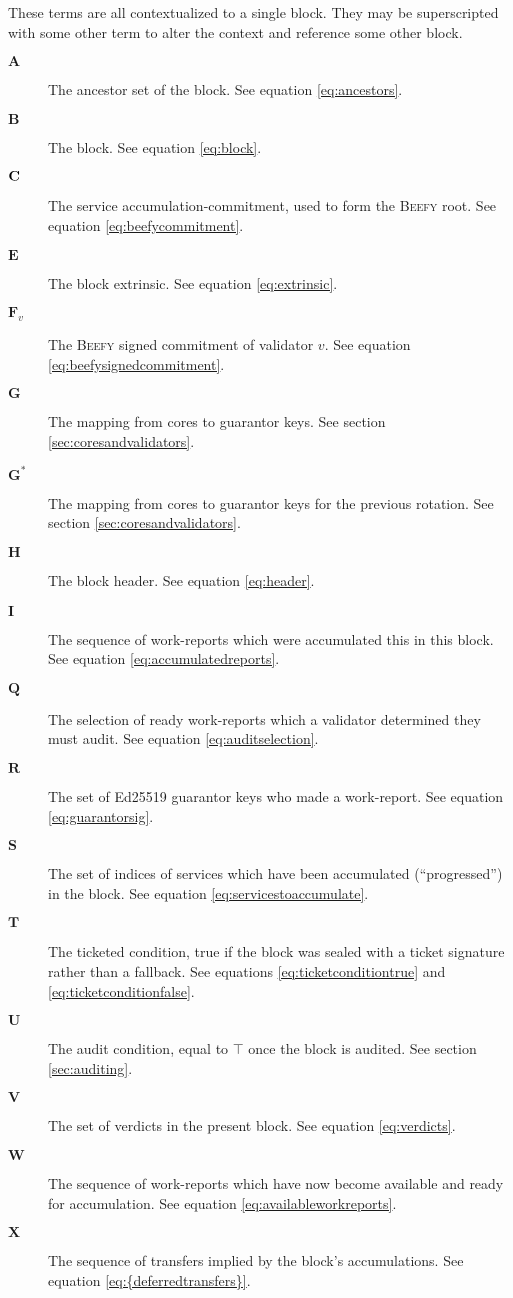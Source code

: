 These terms are all contextualized to a single block. They may be superscripted with some other term to alter the context and reference some other block.
\begin{description}
  \item[$\mathbf{A}$] The ancestor set of the block. See equation \ref{eq:ancestors}.
  \item[$\mathbf{B}$] The block. See equation \ref{eq:block}.
  \item[$\mathbf{C}$] The service accumulation-commitment, used to form the \textsc{Beefy} root. See equation \ref{eq:beefycommitment}.
  \item[$\mathbf{E}$] The block extrinsic. See equation \ref{eq:extrinsic}.
  \item[$\mathbf{F}_v$] The \textsc{Beefy} signed commitment of validator $v$. See equation \ref{eq:beefysignedcommitment}.
  \item[$\mathbf{G}$] The mapping from cores to guarantor keys. See section \ref{sec:coresandvalidators}.
  \item[$\mathbf{G^*}$] The mapping from cores to guarantor keys for the previous rotation. See section \ref{sec:coresandvalidators}.
  \item[$\mathbf{H}$] The block header. See equation \ref{eq:header}.
  \item[$\mathbf{I}$] The sequence of work-reports which were accumulated this in this block. See equation \ref{eq:accumulatedreports}.
  \item[$\mathbf{Q}$] The selection of ready work-reports which a validator determined they must audit. See equation \ref{eq:auditselection}.
  \item[$\mathbf{R}$] The set of Ed25519 guarantor keys who made a work-report. See equation \ref{eq:guarantorsig}.
  \item[$\mathbf{S}$] The set of indices of services which have been accumulated (``progressed'') in the block. See equation \ref{eq:servicestoaccumulate}.
  \item[$\mathbf{T}$] The ticketed condition, true if the block was sealed with a ticket signature rather than a fallback. See equations \ref{eq:ticketconditiontrue} and \ref{eq:ticketconditionfalse}.
  \item[$\mathbf{U}$] The audit condition, equal to $\top$ once the block is audited. See section \ref{sec:auditing}.
  \item[$\mathbf{V}$] The set of verdicts in the present block. See equation \ref{eq:verdicts}.\\
  \item[$\mathbf{W}$] The sequence of work-reports which have now become available and ready for accumulation. See equation \ref{eq:availableworkreports}.
  \item[$\mathbf{X}$] The sequence of transfers implied by the block's accumulations. See equation \ref{eq:{deferredtransfers}}.\\
\end{description}

